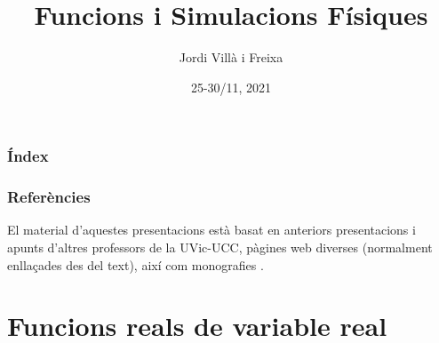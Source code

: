 \documentclass{beamer}
\title[Sistemes d'Equacions]{Funcions i Simulacions Físiques} %
\author{Jordi Villà i Freixa} %
\institute[FCTE] %
{
Universitat de Vic - Universitat Central de Catalunya \\
Grau en Multimèdia. Aplicacions i Videojocs\\ %
\medskip
\textit{jordi.villa@uvic.cat} %
}
\date{25-30/11, 2021}
\begin{document}
\begin{frame}
\titlepage %
\end{frame}

\begin{frame}
\frametitle{Índex} %
\tableofcontents %
\end{frame}


\begin{frame}
\frametitle{Referències}
El material d'aquestes presentacions està basat en anteriors presentacions i apunts d'altres professors \cite{jlgarcia,mcorbera,mcalle} de la UVic-UCC, pàgines web diverses (normalment enllaçades des del text), així com monografies \cite{vanverth,schaum,riley}.
\end{frame}

\section{Funcions reals de variable real} %

\end{document}
